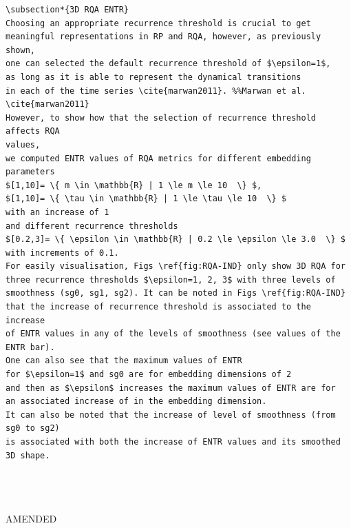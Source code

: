 \documentclass[10pt]{article}
\begin{document}
\begin{enumerate}
\begin{verbatim}
\subsection*{3D RQA ENTR}
Choosing an appropriate recurrence threshold is crucial to get 
meaningful representations in RP and RQA, however, as previously shown, 
one can selected the default recurrence threshold of $\epsilon=1$, 
as long as it is able to represent the dynamical transitions 
in each of the time series \cite{marwan2011}. %%Marwan et al. \cite{marwan2011} 
However, to show how that the selection of recurrence threshold affects RQA
values, 
we computed ENTR values of RQA metrics for different embedding parameters
$[1,10]= \{ m \in \mathbb{R} | 1 \le m \le 10  \} $,
$[1,10]= \{ \tau \in \mathbb{R} | 1 \le \tau \le 10  \} $
with an increase of 1
and different recurrence thresholds 
$[0.2,3]= \{ \epsilon \in \mathbb{R} | 0.2 \le \epsilon \le 3.0  \} $
with increments of 0.1.
For easily visualisation, Figs \ref{fig:RQA-IND} only show 3D RQA for 
three recurrence thresholds $\epsilon=1, 2, 3$ with three levels of 
smoothness (sg0, sg1, sg2). It can be noted in Figs \ref{fig:RQA-IND} 
that the increase of recurrence threshold is associated to the increase 
of ENTR values in any of the levels of smoothness (see values of the ENTR bar).
One can also see that the maximum values of ENTR 
for $\epsilon=1$ and sg0 are for embedding dimensions of 2 
and then as $\epsilon$ increases the maximum values of ENTR are for
an associated increase of in the embedding dimension.
It can also be noted that the increase of level of smoothness (from sg0 to sg2) 
is associated with both the increase of ENTR values and its smoothed 3D shape.




\end{verbatim}

AMENDED
\begin{verbatim}

\end{verbatim}
\end{enumerate}
\end{document}
